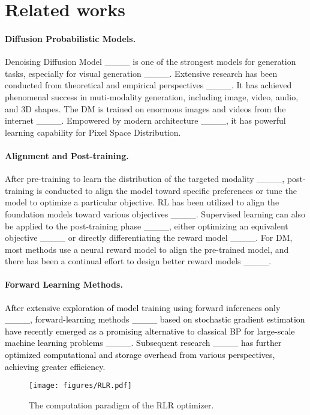 \section{Related works}
\paragraph{Diffusion Probabilistic Models.} Denoising Diffusion Model ____ is one of the strongest models for generation tasks, especially for visual generation ____. Extensive research has been conducted from theoretical and empirical perspectives ____. It has achieved phenomenal success in muti-modality generation, including image, video, audio, and 3D shapes. The DM is trained on enormous images and videos from the internet ____. Empowered by modern architecture ____, it has powerful learning capability for Pixel Space Distribution. 

\paragraph{Alignment and Post-training.} After pre-training to learn the distribution of the targeted modality ____, post-training is conducted to align the model toward specific preferences or tune the model to optimize a particular objective. RL has been utilized to align the foundation models toward various objectives ____. Supervised learning can also be applied to the post-training phase ____, either optimizing an equivalent objective ____ or directly differentiating the reward model ____. For DM, most methods use a neural reward model to align the pre-trained model, and there has been a continual effort to design better reward models ____.

\paragraph{Forward Learning Methods.} 
\textcolor{black}{After extensive exploration of model training using forward inferences only ____, forward-learning methods ____ based on stochastic gradient estimation have recently emerged as a promising alternative to classical BP for large-scale machine learning problems ____. Subsequent research ____ has further optimized computational and storage overhead from various perspectives, achieving greater efficiency.}


\begin{figure*}[!th]
    \centering
    \texttt{[image: figures/RLR.pdf]}
    \vspace{-0.5cm}
    \caption{The computation paradigm of the RLR optimizer.}
    \label{fig:algdiagram}
    \vspace{-0.3cm}
\end{figure*}